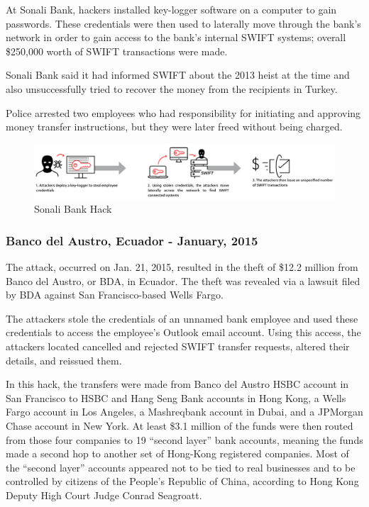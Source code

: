 \documentclass[12pt]{article}
\begin{document}
        At Sonali Bank, hackers installed key-logger software on a computer to gain passwords. These credentials were then used to laterally move through the bank’s network in order to gain access to the bank’s internal SWIFT systems; overall \$250,000 worth of SWIFT transactions were made.
        
        Sonali Bank said it had informed SWIFT about the 2013 heist at the time and also unsuccessfully tried to recover the money from the recipients in Turkey.
        
        Police arrested two employees who had responsibility for initiating and approving money transfer instructions, but they were later freed without being charged.\cite{sonali}
        
        \begin{figure}[H]
        \centering
        \includegraphics[width=\textwidth]{figures/sonali.png}
        \caption{Sonali Bank Hack}
        \label{fig:SonaliHacks}
        \end{figure}
        
    \subsubsection{Banco del Austro, Ecuador - January, 2015}
        The attack, occurred on Jan. 21, 2015, resulted in the theft of \$12.2 million from Banco del Austro, or BDA, in Ecuador. The theft was revealed via a lawsuit filed by BDA against San Francisco-based Wells Fargo. 
        
        The attackers stole the credentials of an unnamed bank employee and used these credentials to access the employee’s Outlook email account. Using this access, the attackers located cancelled and rejected SWIFT transfer requests, altered their details, and reissued them.
        
        In this hack, the transfers were made from Banco del Austro HSBC account in San Francisco to HSBC and Hang Seng Bank accounts in Hong Kong, a Wells Fargo account in Los Angeles, a Mashreqbank account in Dubai, and a JPMorgan Chase account in New York.
        At least \$3.1 million of the funds were then routed from those four companies to 19 “second layer” bank accounts, meaning the funds made a second hop to another set of Hong-Kong registered companies. Most of the “second layer” accounts appeared not to be tied to real businesses and to be controlled by citizens of the People’s Republic of China, according to Hong Kong Deputy High Court Judge Conrad Seagroatt.
        
\end{document}
